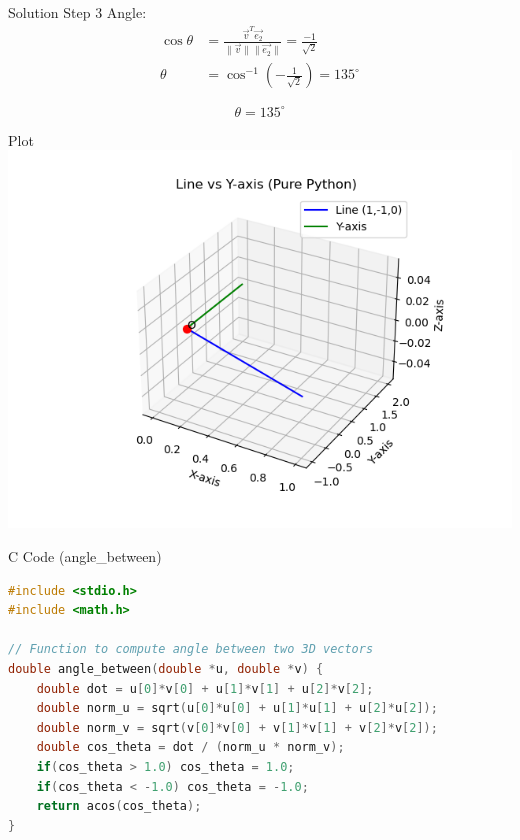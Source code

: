 \documentclass{beamer}
\begin{document}
\begin{frame}{Solution Step 3}
Angle:
\begin{align}
\cos \theta &= \frac{\vec{v}^T\vec{e_2}}{\|\vec{v}\|\|\vec{e_2}\|} 
= \frac{-1}{\sqrt{2}} \\
\theta &= \cos^{-1}\!\left(-\tfrac{1}{\sqrt{2}}\right)
= 135^\circ
\end{align}

\[
\boxed{\theta = 135^\circ}
\]
\end{frame}
\begin{frame}{Plot}
\centering
\includegraphics[width=\columnwidth, height=0.8\textheight, keepaspectratio]{figs/line.png}
\end{frame}

\begin{frame}[fragile]{C Code (angle\_between)}
\begin{lstlisting}[language=C]
#include <stdio.h>
#include <math.h>

// Function to compute angle between two 3D vectors
double angle_between(double *u, double *v) {
    double dot = u[0]*v[0] + u[1]*v[1] + u[2]*v[2];
    double norm_u = sqrt(u[0]*u[0] + u[1]*u[1] + u[2]*u[2]);
    double norm_v = sqrt(v[0]*v[0] + v[1]*v[1] + v[2]*v[2]);
    double cos_theta = dot / (norm_u * norm_v);
    if(cos_theta > 1.0) cos_theta = 1.0;
    if(cos_theta < -1.0) cos_theta = -1.0;
    return acos(cos_theta);
}
\end{lstlisting}
\end{frame}
\end{document}
